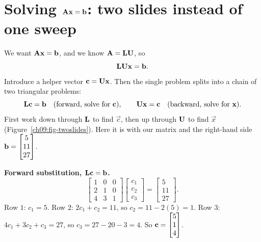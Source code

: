 \section{Solving \texorpdfstring{$\mathbf{A}\mathbf{x}=\mathbf{b}$}{Ax=b}: two slides instead of one sweep}
\label{ch09:two-slides}

We want $\mathbf{A}\mathbf{x}=\mathbf{b}$, and we know $\mathbf{A}=\mathbf{L}\mathbf{U}$,
so
\[
  \mathbf{L}\mathbf{U}\mathbf{x} = \mathbf{b}.
\]
Introduce a helper vector $\mathbf{c} = \mathbf{U}\mathbf{x}$. Then the single problem splits into a
chain of two triangular problems:
\[
  \mathbf{L}\mathbf{c} = \mathbf{b} \quad(\text{forward, solve for }\mathbf{c}),
  \qquad
  \mathbf{U}\mathbf{x} = \mathbf{c} \quad(\text{backward, solve for }\mathbf{x}).
\]
First work down through $\mathbf{L}$ to find $\vec{c}$, then up through $\mathbf{U}$ to find
$\vec{x}$ (Figure~\ref{ch09:fig-twoslides}). Here it is with our matrix and the right-hand side
$\mathbf{b} = \begin{bmatrix}5\\11\\27\end{bmatrix}$.

\textbf{Forward substitution, $\mathbf{L}\mathbf{c}=\mathbf{b}$.}
\[
  \begin{bmatrix} 1 & 0 & 0 \\ 2 & 1 & 0 \\ 4 & 3 & 1 \end{bmatrix}
  \begin{bmatrix} c_1 \\ c_2 \\ c_3 \end{bmatrix}
  = \begin{bmatrix} 5 \\ 11 \\ 27 \end{bmatrix}.
\]
Row $1$: $c_1 = 5$. Row $2$: $2c_1 + c_2 = 11$, so $c_2 = 11 - 2(5) = 1$. Row $3$:
$4c_1 + 3c_2 + c_3 = 27$, so $c_3 = 27 - 20 - 3 = 4$. So
$\mathbf{c} = \begin{bmatrix}5\\1\\4\end{bmatrix}$.

